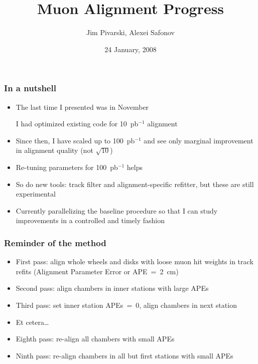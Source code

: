 \documentclass[compress]{beamer}
\title{Muon Alignment Progress}
\author{Jim Pivarski, Alexei Safonov}
\institute{Texas A\&M University}
\date{24 January, 2008}
\begin{document}
\frame{\titlepage}


\begin{frame}
\frametitle{In a nutshell}
\begin{itemize}\setlength{\itemsep}{0.35 cm}
\item The last time I presented was in November

\vspace{0.1 cm}
I had optimized existing code for 10~pb$^{-1}$ alignment

\item Since then, I have scaled up to 100~pb$^{-1}$ and see only
marginal improvement in alignment quality (not $\sqrt{10}$)

\item Re-tuning parameters for 100~pb$^{-1}$ helps

\item So do new tools: track filter and alignment-specific refitter,
but these are still experimental

\item Currently parallelizing the baseline procedure so that I can
study improvements in a controlled and timely fashion
\end{itemize}
\end{frame}

\begin{frame}
\frametitle{Reminder of the method}
\begin{itemize}\setlength{\itemsep}{0.35 cm}
\item First pass: align whole wheels and disks with loose muon hit
weights in track refits (Alignment Parameter Error or APE~=~2~cm)

\item Second pass: align chambers in inner stations with large APEs

\item Third pass: set inner station APEs~=~0, align chambers in next station

\item Et cetera\ldots

\item Eighth pass: re-align all chambers with small APEs

\item Ninth pass: re-align chambers in all but first stations with small APEs
\end{itemize}
\end{frame}
\end{document}
